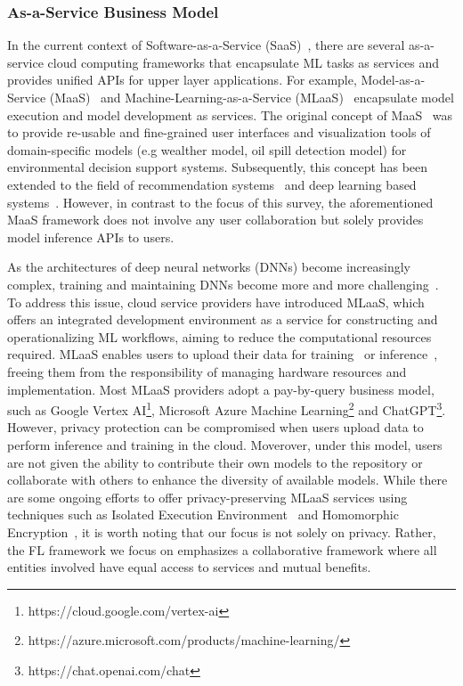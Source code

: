 \subsubsection{As-a-Service Business Model}

In the current context of Software-as-a-Service (SaaS)~\cite{brereton1999future}, there are several as-a-service cloud computing frameworks that encapsulate ML tasks as services and provides unified APIs for upper layer applications. 
For example, Model-as-a-Service (MaaS)~\cite{geller2007model, roman2009model, zou2012maas, liu2021jizhi, sun2022black} and Machine-Learning-as-a-Service (MLaaS)~\cite{ribeiro2015mlaas, hanzlik2021mlcapsule, hesamifard2018privacy,li2017scaling, kourtellis2020flaas} encapsulate model execution and model development as services.
The original concept of MaaS~\cite{geller2007model, roman2009model} was to provide re-usable and fine-grained user interfaces and visualization tools of domain-specific models (e.g wealther model, oil spill detection model) for environmental decision support systems.
Subsequently, this concept has been extended to the field of recommendation systems~\cite{zou2012maas} and deep learning based systems~\cite{liu2021jizhi, sun2022black}.
However, in contrast to the focus of this survey, the aforementioned MaaS framework does not involve any user collaboration but solely provides model inference APIs to users.

As the architectures of deep neural networks (DNNs) become increasingly complex, training and maintaining DNNs become more and more challenging~\cite{han2021pre}. To address this issue, cloud service providers have introduced MLaaS, which offers an integrated development environment as a service for constructing and operationalizing ML workflows, aiming to reduce the computational resources required.
MLaaS enables users to upload their data for training~\cite{ribeiro2015mlaas, zhao2021veriml, hesamifard2018privacy} or inference~\cite{hanzlik2021mlcapsule}, freeing them from the responsibility of managing hardware resources and implementation.
Most MLaaS providers adopt a pay-by-query business model, such as Google Vertex AI\footnote{https://cloud.google.com/vertex-ai}, Microsoft Azure Machine Learning\footnote{https://azure.microsoft.com/products/machine-learning/} and ChatGPT\footnote{https://chat.openai.com/chat}.
However, privacy protection can be compromised when users upload data to perform inference and training in the cloud.
Moverover, under this model, users are not given the ability to contribute their own models to the repository or collaborate with others to enhance the diversity of available models. 
While there are some ongoing efforts to offer privacy-preserving MLaaS services using techniques such as Isolated Execution Environment~\cite{hanzlik2021mlcapsule, mckeen2016intel} and Homomorphic Encryption~\cite{hesamifard2018privacy,gentry2009fully}, it is worth noting that our focus is not solely on privacy.
Rather, the FL framework we focus on emphasizes a collaborative framework where all entities involved have equal access to services and mutual benefits.

